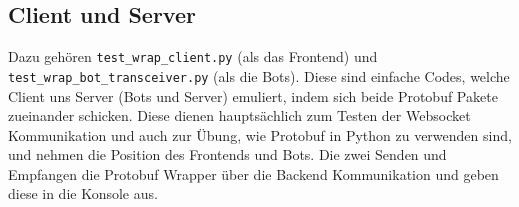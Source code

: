 \subsection{Client und Server}
Dazu gehören \texttt{test\_wrap\_client.py} (als das Frontend) 
und \texttt{test\_wrap\_bot\_transceiver.py} (als die Bots).
Diese sind einfache Codes, welche Client uns Server (Bots und Server) emuliert, 
indem sich beide Protobuf Pakete zueinander schicken. 
Diese dienen hauptsächlich zum Testen der Websocket Kommunikation 
und auch zur Übung, wie Protobuf in Python zu verwenden sind, 
und nehmen die Position des Frontends und Bots.
Die zwei Senden und Empfangen die Protobuf Wrapper über die Backend Kommunikation 
und geben diese in die Konsole aus.

